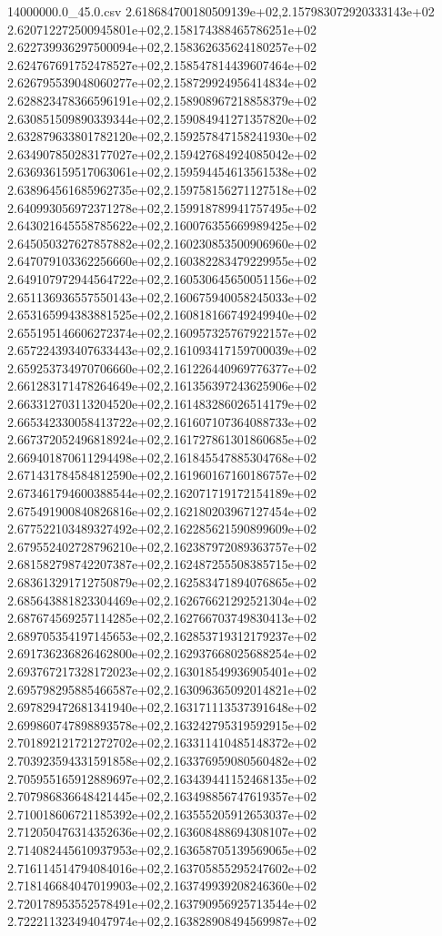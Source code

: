 \begin{filecontents*}{14000000.0_45.0.csv}
2.618684700180509139e+02,2.157983072920333143e+02
2.620712272500945801e+02,2.158174388465786251e+02
2.622739936297500094e+02,2.158362635624180257e+02
2.624767691752478527e+02,2.158547814439607464e+02
2.626795539048060277e+02,2.158729924956414834e+02
2.628823478366596191e+02,2.158908967218858379e+02
2.630851509890339344e+02,2.159084941271357820e+02
2.632879633801782120e+02,2.159257847158241930e+02
2.634907850283177027e+02,2.159427684924085042e+02
2.636936159517063061e+02,2.159594454613561538e+02
2.638964561685962735e+02,2.159758156271127518e+02
2.640993056972371278e+02,2.159918789941757495e+02
2.643021645558785622e+02,2.160076355669989425e+02
2.645050327627857882e+02,2.160230853500906960e+02
2.647079103362256660e+02,2.160382283479229955e+02
2.649107972944564722e+02,2.160530645650051156e+02
2.651136936557550143e+02,2.160675940058245033e+02
2.653165994383881525e+02,2.160818166749249940e+02
2.655195146606272374e+02,2.160957325767922157e+02
2.657224393407633443e+02,2.161093417159700039e+02
2.659253734970706660e+02,2.161226440969776377e+02
2.661283171478264649e+02,2.161356397243625906e+02
2.663312703113204520e+02,2.161483286026514179e+02
2.665342330058413722e+02,2.161607107364088733e+02
2.667372052496818924e+02,2.161727861301860685e+02
2.669401870611294498e+02,2.161845547885304768e+02
2.671431784584812590e+02,2.161960167160186757e+02
2.673461794600388544e+02,2.162071719172154189e+02
2.675491900840826816e+02,2.162180203967127454e+02
2.677522103489327492e+02,2.162285621590899609e+02
2.679552402728796210e+02,2.162387972089363757e+02
2.681582798742207387e+02,2.162487255508385715e+02
2.683613291712750879e+02,2.162583471894076865e+02
2.685643881823304469e+02,2.162676621292521304e+02
2.687674569257114285e+02,2.162766703749830413e+02
2.689705354197145653e+02,2.162853719312179237e+02
2.691736236826462800e+02,2.162937668025688254e+02
2.693767217328172023e+02,2.163018549936905401e+02
2.695798295885466587e+02,2.163096365092014821e+02
2.697829472681341940e+02,2.163171113537391648e+02
2.699860747898893578e+02,2.163242795319592915e+02
2.701892121721272702e+02,2.163311410485148372e+02
2.703923594331591858e+02,2.163376959080560482e+02
2.705955165912889697e+02,2.163439441152468135e+02
2.707986836648421445e+02,2.163498856747619357e+02
2.710018606721185392e+02,2.163555205912653037e+02
2.712050476314352636e+02,2.163608488694308107e+02
2.714082445610937953e+02,2.163658705139569065e+02
2.716114514794084016e+02,2.163705855295247602e+02
2.718146684047019903e+02,2.163749939208246360e+02
2.720178953552578491e+02,2.163790956925713544e+02
2.722211323494047974e+02,2.163828908494569987e+02

\end{filecontents*}
